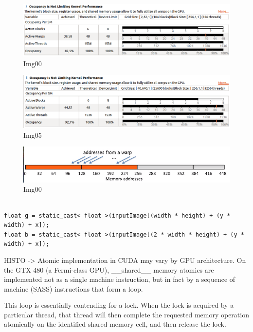 \documentclass[a4paper]{article}
\begin{document}
\begin{figure}[ht]
    \centering
    \includegraphics[width=0.7\linewidth]{profiling/darker/darker_occupancy_00}
    \caption{Img00}
    \label{fig:occ00}
\end{figure}
\FloatBarrier

\begin{figure}[ht]
    \centering
    \includegraphics[width=0.7\linewidth]{profiling/darker/darker_06_occupancy}
    \caption{Img05}
    \label{fig:occ06}
\end{figure}
\FloatBarrier

\begin{figure}[ht]
    \centering
    \includegraphics[width=0.7\linewidth]{profiling/darker/unaligned_load}
    \caption{Img00}
    \label{fig:unlo}
\end{figure}
\FloatBarrier

\begin{lstlisting}[label=loop, caption=Unaligned accesses]

float g = static_cast< float >(inputImage[(width * height) + (y * width) + x]);
float b = static_cast< float >(inputImage[(2 * width * height) + (y * width) + x]);

\end{lstlisting}
\FloatBarrier

 



HISTO -> Atomic implementation in CUDA may vary by GPU architecture. On the GTX 480 (a Fermi-class GPU), \_\_shared\_\_ memory atomics are implemented not as a single machine instruction, but in fact by a sequence of machine (SASS) instructions that form a loop.

This loop is essentially contending for a lock. When the lock is acquired by a particular thread, that thread will then complete the requested memory operation atomically on the identified shared memory cell, and then release the lock.
\end{document}
